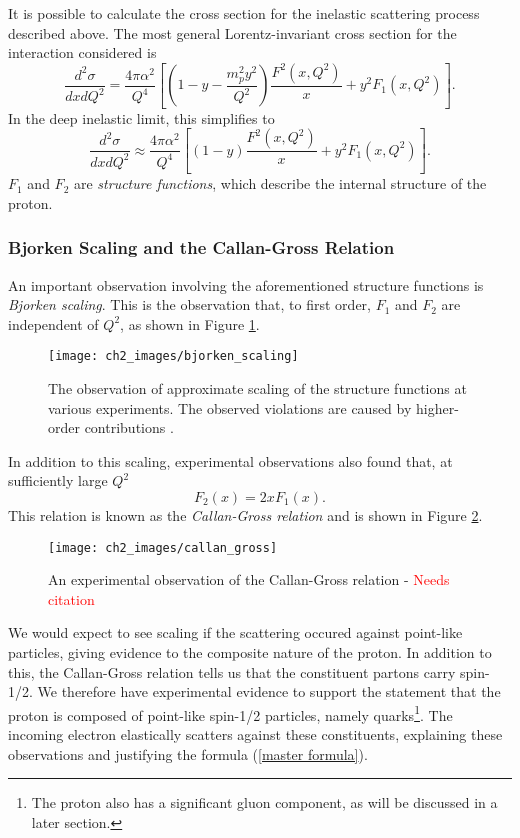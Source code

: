 \documentclass[10pt,a4paper]{book}
\newcommand\todo[1]{\textcolor{red}{#1}}
\begin{document}
It is possible to calculate the cross section for the inelastic scattering process described above. The most general Lorentz-invariant cross section for the interaction considered is
\begin{equation}
\frac{d^2\sigma}{dxdQ^2} = \frac{4\pi\alpha^2}{Q^4}\left[\left(1 - y - \frac{m_p^2 y^2}{Q^2} \right)\frac{F^2(x,Q^2)}{x} + y^2F_1(x,Q^2)\right].
\end{equation}
In the deep inelastic limit, this simplifies to
\begin{equation}
\frac{d^2\sigma}{dxdQ^2} \approx \frac{4\pi\alpha^2}{Q^4}\left[\left( 1 - y \right) \frac{F^2(x,Q^2)}{x} + y^2F_1(x,Q^2)\right]. 
\label{Rutherford}
\end{equation}
$F_1$ and $F_2$ are \emph{structure functions}, which describe the internal structure of the proton.

\subsubsection{Bjorken Scaling and the Callan-Gross Relation}
An important observation involving the aforementioned structure functions is \emph{Bjorken scaling}. This is the observation that, to first order, $F_1$ and $F_2$ are independent of $Q^2$, as shown in Figure \ref{Bjorken scaling}.
\begin{figure}[h!]
\centering
\texttt{[image: ch2\_images/bjorken\_scaling]}
\caption{The observation of approximate scaling of the structure functions at various experiments. The observed violations are caused by higher-order contributions \cite{Banerjee}.}
\label{Bjorken scaling}
\end{figure}
In addition to this scaling, experimental observations also found that, at sufficiently large $Q^2$
\begin{equation}
F_2(x) = 2xF_1(x).
\end{equation}
This relation is known as the \emph{Callan-Gross relation} and is shown in Figure \ref{Callan gross}.
\begin{figure}[h!]
\centering
\texttt{[image: ch2\_images/callan\_gross]}
\caption{An experimental observation of the Callan-Gross relation - \todo{Needs citation}}
\label{Callan gross}
\end{figure}
We would expect to see scaling if the scattering occured against point-like particles, giving evidence to the composite nature of the proton. In addition to this, the Callan-Gross relation tells us that the constituent partons carry spin-1/2. We therefore have experimental evidence to support the statement that the proton is composed of point-like spin-1/2 particles, namely quarks\footnote{The proton also has a significant gluon component, as will be discussed in a later section.}. The incoming electron elastically scatters against these constituents, explaining these observations and justifying the formula (\ref{master formula}).
\end{document}
